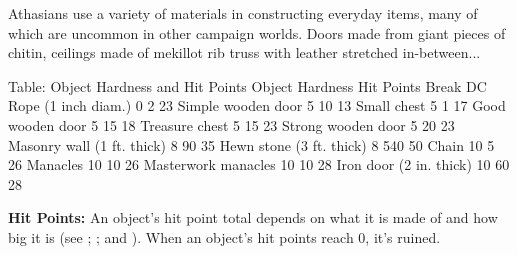 Athasians use a variety of materials in constructing everyday items, many of which are uncommon in other campaign worlds. Doors made from giant pieces of chitin, ceilings made of mekillot rib truss with leather stretched in-between...


Table: Object Hardness and Hit Points
Object	Hardness	Hit Points	Break DC
Rope (1 inch diam.)	0	2	23
Simple wooden door	5	10	13
Small chest	5	1	17
Good wooden door	5	15	18
Treasure chest	5	15	23
Strong wooden door	5	20	23
Masonry wall (1 ft. thick)	8	90	35
Hewn stone (3 ft. thick)	8	540	50
Chain	10	5	26
Manacles	10	10	26
Masterwork manacles	10	10	28
Iron door (2 in. thick)	10	60	28

\textbf{Hit Points:} An object's hit point total depends on what it is made of and how big it is (see ; ; and ). When an object's hit points reach 0, it's ruined.

